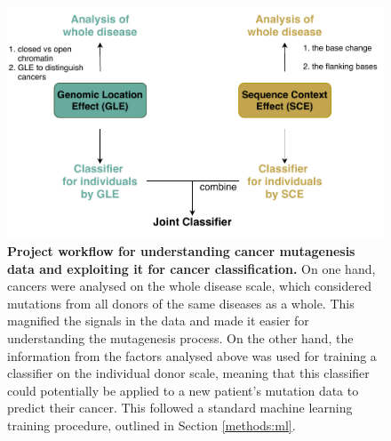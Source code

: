 \begin{figure}[ht!]
    \centering
    \includegraphics[scale=0.85]{graphics/workflow.pdf}
    \caption{\textbf{Project workflow for understanding cancer mutagenesis data and exploiting it for cancer classification.} On one hand, cancers were analysed on the whole disease scale, which considered mutations from all donors of the same diseases as a whole. This magnified the signals in the data and made it easier for understanding the mutagenesis process. On the other hand, the information from the factors analysed above was used for training a classifier on the individual donor scale, meaning that this classifier could potentially be applied to a new patient's mutation data to predict their cancer. This followed a standard machine learning training procedure, outlined in Section \ref{methods:ml}.}
    \label{fig:workflow}
\end{figure}
